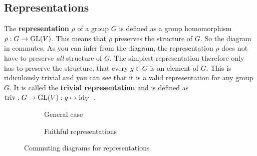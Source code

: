 \subsection{Representations}

The \textbf{representation} $\rho$ of a group $G$ is defined as a group homomorphism $\rho: G \to \operatorname{GL}(V)$.
This means that $\rho$ preserves the structure of $G$.
So the diagram in  commutes.
As you can infer from the diagram, the representation $\rho$ does not have to preserve \textit{all} structure of $G$.
The simplest representation therefore only has to preserve the structure, that every $g \in G$ is an element of $G$.
This is ridiculously trivial and you can see that it is a valid representation for any group $G$.
It is called the \textbf{trivial representation} and is defined as $\operatorname{triv}: G \to \operatorname{GL}(V): g \mapsto \operatorname{id}_V$~\cite{Hein2013}.

\begin{figure}[h]
    \begin{subfigure}{.5 \textwidth}
        \centering
        \caption{General case}
        \label{fig:main.what.rep-cd}
    \end{subfigure}
    \begin{subfigure}{.5 \textwidth}
        \centering
        \caption{Faithful representations}
        \label{fig:main.what.faith-rep-cd}
    \end{subfigure}
    \caption{Commuting diagrams for representations}
\end{figure}

